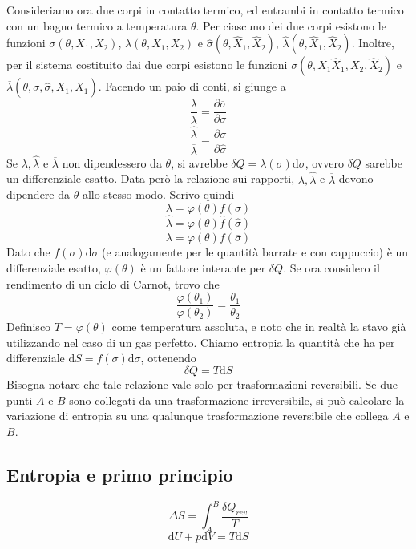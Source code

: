 \documentclass[a4paper,11pt]{article}
\begin{document}
\noindent Consideriamo ora due corpi in contatto termico, ed entrambi in contatto termico con un bagno termico a temperatura $\theta$. Per ciascuno dei due corpi esistono le funzioni $\sigma(\theta,X_1,X_2)$, $\lambda(\theta,X_1,X_2)$ e $\hat{\sigma}(\theta,\hat{X}_1,\hat X_2)$, $\hat{\lambda}(\theta,\hat X_1,\hat X_2)$. Inoltre, per il sistema costituito dai due corpi esistono le funzioni $\overline{\sigma}(\theta,X_1\hat X_1,X_2,\hat X_2)$ e $\overline{\lambda}(\theta,\sigma,\hat{\sigma},X_1,\hat X_1)$. Facendo un paio di conti, si giunge a
\[\frac{\lambda}{\overline{\lambda}}=\frac{\partial \overline{\sigma}}{\partial \sigma}\]
\[\frac{\hat\lambda}{\overline{\lambda}}=\frac{\partial \overline{\sigma}}{\partial \hat\sigma}\]
Se $\lambda,\hat{\lambda}$ e $\overline{\lambda}$ non dipendessero da $\theta$, si avrebbe $\delta Q=\lambda(\sigma)\mathrm{d}\sigma$, ovvero $\delta Q$ sarebbe un differenziale esatto. Data però la relazione sui rapporti, $\lambda,\hat{\lambda}$ e $\overline{\lambda}$ devono dipendere da $\theta$ allo stesso modo. Scrivo quindi
\[\lambda=\varphi(\theta)f(\sigma)\]
\[\hat{\lambda}=\varphi(\theta)\hat{f}(\hat\sigma)\]
\[\overline{\lambda}=\varphi(\theta)\overline{f}(\overline\sigma)\]
Dato che $f(\sigma)\mathrm{d}\sigma$ (e analogamente per le quantità barrate e con cappuccio) è un differenziale esatto, $\varphi(\theta)$ è un fattore interante per $\delta Q$. Se ora considero il rendimento di un ciclo di Carnot, trovo che
\[\frac{\varphi(\theta_1)}{\varphi(\theta_2)}=\frac{\theta_1}{\theta_2}\]
Definisco $T=\varphi(\theta)$ come temperatura assoluta, e noto che in realtà la stavo già utilizzando nel caso di un gas perfetto. Chiamo entropia la quantità che ha per differenziale $\mathrm{d}S=f(\sigma)\mathrm{d}\sigma$, ottenendo
\[\delta Q=T\mathrm{d}S\]
Bisogna notare che tale relazione vale solo per trasformazioni reversibili. Se due punti $A$ e $B$ sono collegati da una trasformazione irreversibile, si può calcolare la variazione di entropia su una qualunque trasformazione reversibile che collega $A$ e $B$.

\subsection{Entropia e primo principio}
\[\Delta S=\int_{A}^{B}\frac{\delta Q_{rev}}{T}\]
\[\mathrm{d}U+p\mathrm{d}V=T\mathrm{d}S\]
\end{document}
